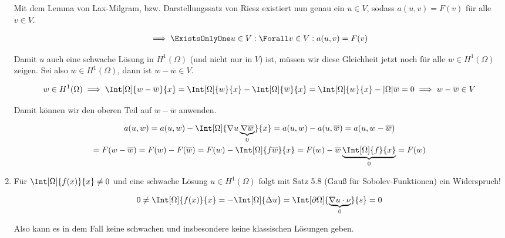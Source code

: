 \begin{solution}
\begin{enumerate}[label = \alph*)]
\begin{enumerate}[label = \arabic*.]
    \end{enumerate}

    Mit dem Lemma von Lax-Milgram, bzw. Darstellungssatz von Riesz existiert nun genau ein $u \in V$, sodass $a(u, v) = F(v)$ für alle $v \in V$.

    \begin{align*}
        \implies
        \ExistsOnlyOne u \in V:
        \Forall v \in V:
        a(u, v) = F(v)
    \end{align*}    

    Damit $u$ auch eine schwache Lösung in $H^1(\Omega)$ (und nicht nur in $V$) ist, müssen wir diese Gleichheit jetzt noch für alle $w \in H^1(\Omega)$ zeigen.
    Sei also $w \in H^1(\Omega)$, dann ist $w - \overline{w} \in V$.

    \begin{align*}
        w \in H^1(\Omega)
        \implies
        \Int[\Omega]{w - \overline{w}}{x}
        =
        \Int[\Omega]{w}{x} - \Int[\Omega]{\overline{w}}{x}
        =
        \Int[\Omega]{w}{x} - |\Omega| \overline{w}
        =
        0
        \implies
        w - \overline{w} \in V
    \end{align*}

    Damit können wir den oberen Teil auf $w - \overline{w}$ anwenden.

    \begin{multline*}
        a(u, w)
        =
        a(u, w) - \Int[\Omega]{\nabla u \underbrace{\nabla \overline{w}}_0}{x}
        =
        a(u, w) - a(u, \overline{w})
        =
        a(u, w - \overline{w}) \\
        =
        F(w - \overline{w})
        =
        F(w) - F(\overline{w})
        =
        F(w) - \Int[\Omega]{f \overline{w}}{x}
        =
        F(w) - \overline{w} \underbrace{\Int[\Omega]{f}{x}}_0
        =
        F(w)
    \end{multline*}
    
    \item Für $\Int[\Omega]{f(x)}{x} \neq 0$ und eine schwache Lösung $u \in H^1(\Omega)$ folgt mit Satz 5.8 (Gauß für Sobolev-Funktionen) ein Widerspruch!

    \begin{align*}
        0
        \neq
        \Int[\Omega]{f(x)}{x}
        =
        -\Int[\Omega]{\Delta u}
        =
        \Int[\partial \Omega]{\underbrace{\nabla u \cdot \nu}_0}{s}
        =
        0
    \end{align*}

    Also kann es in dem Fall keine schwachen und insbesondere keine klassischen Lösungen geben.

\end{enumerate}

\end{solution}

